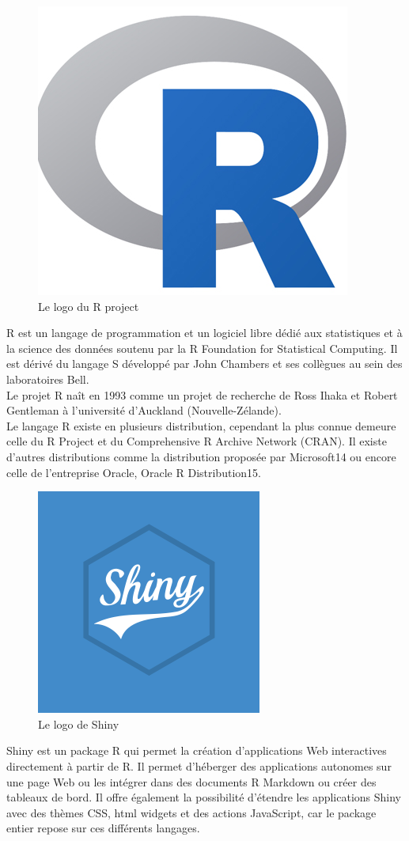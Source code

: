 \documentclass[12pt,a4paper]{report}
\begin{document}
\begin{figure}[!h]
	\center
	\includegraphics[scale=0.2]{img/R_logo.png}
	\caption {Le logo du R project}
\end{figure}
R est un langage de programmation et un logiciel libre dédié aux statistiques et à la science des données soutenu par la R Foundation for Statistical Computing. Il est dérivé du langage S développé par John Chambers et ses collègues au sein des laboratoires Bell.\\
Le projet R naît en 1993 comme un projet de recherche de Ross Ihaka et Robert Gentleman à l'université d'Auckland (Nouvelle-Zélande). \\
Le langage R existe en plusieurs distribution, cependant la plus connue demeure celle du R Project et du Comprehensive R Archive Network (CRAN). Il existe d'autres distributions comme la distribution proposée par Microsoft14 ou encore celle de l'entreprise Oracle, Oracle R Distribution15.\\

\begin{figure}
	\center
	\includegraphics[scale=0.3]{img/Shiny_logo.png}
	\caption {Le logo de Shiny}
\end{figure}
Shiny est un package R qui permet la création d'applications Web interactives directement à partir de R. Il permet d’héberger des applications autonomes sur une page Web ou les intégrer dans des documents R Markdown ou créer des tableaux de bord. Il offre également la possibilité d’étendre les applications Shiny avec des thèmes CSS, html widgets et des actions JavaScript, car le package entier repose sur ces différents langages. \\
\end{document}
